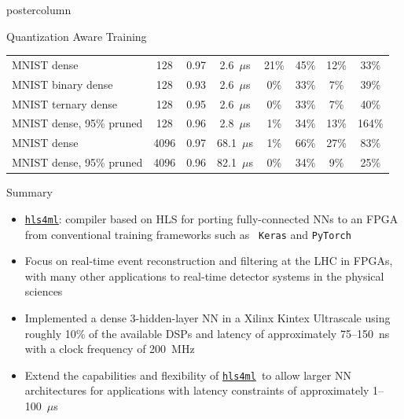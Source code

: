 \documentclass[final,hyperref={pdfpagelabels=false}]{beamer}
\newcommand{\hlsfml}{{\href{https://github.com/hls-fpga-machine-learning/hls4ml}{\texttt{hls4ml}}}}
\begin{document}
\begin{frame}
\begin{columns}
\begin{column}{.49\textwidth}
\begin{beamercolorbox}[center,wd=\textwidth]{postercolumn}
\begin{minipage}[T]{.95\textwidth}
{\begin{block}{Quantization Aware Training}
\begin{center}
{\begin{tabular}{l|ccccccc}
                        MNIST dense                                            &  128 & 0.97 & 2.6~$\mu$s & 21\% & 45\%& 12\% & 33\%\\
                        MNIST binary dense                                 &  128 & 0.93 & 2.6~$\mu$s & 0\% & 33\%& 7\% & 39\%\\ 
                        MNIST ternary dense                                &  128 & 0.95 & 2.6~$\mu$s & 0\% & 33\%& 7\% & 40\%\\ 
                        MNIST dense, 95\% pruned &  128 & 0.96 & 2.8~$\mu$s & 1\% & 34\% & 13\% & 164\%\\
                        MNIST dense                       &  4096 & 0.97 & 68.1~$\mu$s &1\% & 66\%&27\% &83\%\\ 
                        MNIST dense, 95\% pruned &  4096 & 0.96 & 82.1~$\mu$s & 0\% & 34\% & 9\% & 25\%\\ 
                      \end{tabular}}                       
                  \end{center}
                \end{block}                
                \begin{block}{Summary}
                  \begin{itemize}
                    \item \hlsfml: compiler based on HLS for porting
                      fully-connected NNs to an FPGA from
                      conventional training frameworks such as {\tt
                        Keras} and {\tt PyTorch}
                      \item Focus on real-time
                        event reconstruction and filtering at the LHC
                        in FPGAs, with many other applications to real-time detector systems in the physical
                        sciences 
                        \item  Implemented a dense 3-hidden-layer NN
                          in a Xilinx Kintex Ultrascale using roughly
                          10\% of the available DSPs and latency of
                          approximately 75--150~ns with a clock
                          frequency of 200~MHz 
                          \item Extend the capabilities and
                            flexibility of \hlsfml~to allow larger
                            NN architectures for applications with
                            latency constraints of approximately 1--100~$\mu$s 

\end{itemize}
\end{block}}
\end{minipage}
\end{beamercolorbox}
\end{column}
\end{columns}
\end{frame}
\end{document}
